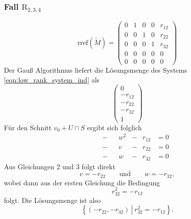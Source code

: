\documentclass[a4paper,oneside, 11pt, openany%
]{article}
\theoremstyle{custom}
\theoremstyle{custom}
\begin{document}
\subsubsection*{Fall $\text{R}_{2,3,4}$}
\begin{equation*}\label{eqn:rref_r234}
	\text{rref}(\tilde{M}) =
	\left( \begin{array}{ccccc}
		0&1&0&0&r_{12}\\
		0&0&1&0&r_{22}\\
		0&0&0&1&r_{32}\\
		0&0&0&0&0\\
		0&0&0&0&0
	\end{array}\right)
\end{equation*}
Der Gauß Algorithmus liefert die Lösungsmenge des Systems \eqref{eqn:low_rank_system_ind} als
\begin{equation*}
	\begin{pmatrix}
		0\\
		-r_{12}\\
		-r_{22}\\
		-r_{32}\\
		1
	\end{pmatrix}
\end{equation*}
Für den Schnitt $v_0 + U \cap S $ ergibt sich folglich
\begin{equation*}
	\begin{alignedat}{8}
		&&&-&&w^2&-&r_{12}&=0\\
		&&&-&&v&-&r_{22}&=0\\
		&&&-&&w&-&r_{32}&=0
	\end{alignedat}
\end{equation*}
Aus Gleichungen 2 und 3 folgt direkt
\begin{equation}
	v = -r_{22} \qquad \text{und}\qquad w=-r_{32},
\end{equation}
wobei dann aus der ersten Gleichung die Bedingung
\begin{equation}
	r_{32}^2=-r_{12}
\end{equation}
folgt.
Die Lösungsmenge ist also
\begin{equation*}
	\left\lbrace (-r_{22},-r_{32}) \ \left| \ r_{32}^2=-r_{12} \right.\right\rbrace .
\end{equation*} 
\end{document}
